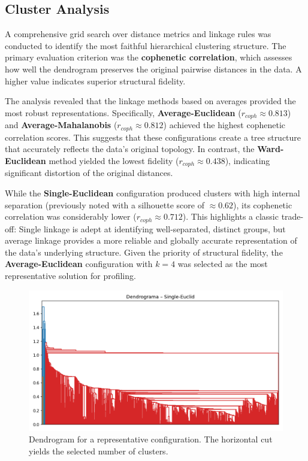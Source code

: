\documentclass[journal]{IEEEtran}
\begin{document}
\subsection{Cluster Analysis}
A comprehensive grid search over distance metrics and linkage rules was conducted to identify the most faithful hierarchical clustering structure. The primary evaluation criterion was the \textbf{cophenetic correlation}, which assesses how well the dendrogram preserves the original pairwise distances in the data. A higher value indicates superior structural fidelity.

The analysis revealed that the linkage methods based on averages provided the most robust representations. Specifically, \textbf{Average-Euclidean} ($r_{coph} \approx 0.813$) and \textbf{Average-Mahalanobis} ($r_{coph} \approx 0.812$) achieved the highest cophenetic correlation scores. This suggests that these configurations create a tree structure that accurately reflects the data's original topology. In contrast, the \textbf{Ward-Euclidean} method yielded the lowest fidelity ($r_{coph} \approx 0.438$), indicating significant distortion of the original distances.

While the \textbf{Single-Euclidean} configuration produced clusters with high internal separation (previously noted with a silhouette score of $\approx 0.62$), its cophenetic correlation was considerably lower ($r_{coph} \approx 0.712$). This highlights a classic trade-off: Single linkage is adept at identifying well-separated, distinct groups, but average linkage provides a more reliable and globally accurate representation of the data's underlying structure. Given the priority of structural fidelity, the \textbf{Average-Euclidean} configuration with $k=4$ was selected as the most representative solution for profiling.

\begin{figure}[H]
	\centering
	\includegraphics[width=0.8\columnwidth]{assets/4_dendogram_single.png} %
	\caption{Dendrogram for a representative configuration. The horizontal cut yields the selected number of clusters.}
	\label{fig:dendro_single_euclid}
\end{figure}
\end{document}

